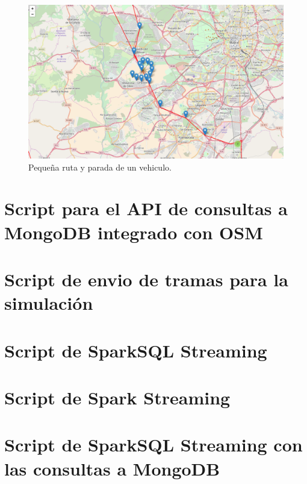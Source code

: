 \begin{figure}[htp]
\centering
\includegraphics[scale=.30]{Anexos/rutaConParada.png}
\caption{Pequeña ruta y parada de un vehiculo.}
\label{littleRouteWithStop}
\end{figure}


\chapter{Script para el API de consultas a MongoDB integrado con OSM\label{apendB}}


\newpage
\chapter{Script de envio de tramas para la simulación\label{apendC}}


\newpage
\chapter{Script de SparkSQL Streaming}\label{apendD}


\newpage
\chapter{Script de Spark Streaming}\label{apendE}


\newpage
\chapter{Script de SparkSQL Streaming con las consultas a MongoDB}\label{apendF}


